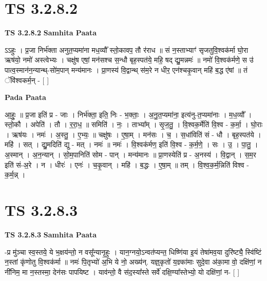 \documentclass[17pt]{extarticle}
\begin{document}

\section{ TS 3.2.8.2 }

\textbf{TS 3.2.8.2 } \newline
\textbf{Samhita Paata} \newline

ऽऽहुः । प्र॒जा निर्भ॑क्ता अनुत॒प्यमा॑ना मध॒व्यौ᳚ स्तो॒कावप॒ तौ र॑राध ॥ सं न॒स्ताभ्याꣳ॑ सृजतुवि॒श्वक॑र्मा घो॒रा ऋष॑यो॒ नमो॑ अस्त्वेभ्यः । चक्षु॑ष एषां॒ मन॑सश्च स॒न्धौ बृह॒स्पत॑ये॒ महि॒ षद् द्यु॒मन्नमः॑ ॥ नमो॑ वि॒श्वक॑र्मणे॒ स उ॑ पात्व॒स्मान॑न॒न्यान्थ्-सो॑म॒पान् मन्य॑मानः । प्रा॒णस्य॑ वि॒द्वान्थ् स॑म॒रे न धीर॒ एन॑श्चकृ॒वान् महि॑ ब॒द्ध ए॑षां ॥ तं ॅवि॑श्वकर्म॒न् - [  ] \newline

\textbf{Pada Paata} \newline

आ॒हुः॒ ॥ प्र॒जा इति॑ प्र - जाः । निर्भ॑क्ता॒ इति॒ निः - भ॒क्ताः॒ । अ॒नु॒त॒प्यमा॑ना॒ इत्य॑नु-त॒प्यमा॑नाः । म॒ध॒व्यौ᳚ । स्तो॒कौ । अपेति॑ । तौ । र॒रा॒ध॒ ॥ समिति॑ । नः॒ । ताभ्या᳚म् । सृ॒ज॒तु॒ । वि॒श्वक॒र्मेति॑ वि॒श्व - क॒र्मा॒ । घो॒राः । ऋष॑यः । नमः॑ । अ॒स्तु॒ । ए॒भ्यः॒ ॥ चक्षु॑षः । ए॒षा॒म् । मन॑सः । च॒ । स॒धांविति॑ सं - धौ । बृह॒स्पत॑ये । महि॑ । सत् । द्यु॒मदिति॑ द्यु - मत् । नमः॑ ॥ नमः॑ । वि॒श्वक॑र्मण॒ इति॑ वि॒श्व - क॒र्म॒णे॒ । सः । उ॒ । पा॒तु॒ । अ॒स्मान् । अ॒न॒न्यान् । सो॒म॒पानिति॑ सोम - पान् । मन्य॑मानः ॥ प्रा॒णस्येति॑ प्र - अ॒नस्य॑ । वि॒द्वान् । स॒म॒र इति॑ सं-अ॒रे । न । धीरः॑ । एनः॑ । च॒कृ॒वान् । महि॑ । ब॒द्धः । ए॒षा॒म् ॥ तम् । वि॒श्व॒क॒र्म॒न्निति॑ विश्व - क॒र्म॒न्न् ।  \newline





\section{ TS 3.2.8.3 }

\textbf{TS 3.2.8.3 } \newline
\textbf{Samhita Paata} \newline

-प्र मु॑ञ्चा स्व॒स्तये॒ ये भ॒क्षय॑न्तो॒ न वसू᳚न्यानृ॒हुः । यान॒ग्नयो॒ऽन्वत॑प्यन्त॒ धिष्णि॑या इ॒यं तेषा॑मव॒या दुरि॑ष्ट्यै॒ स्वि॑ष्टिं न॒स्तां कृ॑णोतु वि॒श्वक॑र्मा ॥ नमः॑ पि॒तृभ्यो॑ अ॒भि ये नो॒ अख्य॑न्. यज्ञ्॒कृतो॑ य॒ज्ञ्का॑माः सुदे॒वा अ॑का॒मा वो॒ दक्षि॑णां॒ न नी॑निम॒ मा न॒स्तस्मा॒ देन॑सः पापयिष्ट । याव॑न्तो॒ वै स॑द॒स्या᳚स्ते सर्वे॑ दक्षि॒ण्या᳚स्तेभ्यो॒ यो दक्षि॑णां॒ न-  [  ] \newline
\end{document}
